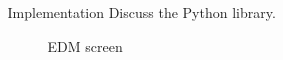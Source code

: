 \documentclass[final,t]{beamer}
\begin{document}
\begin{frame}
\begin{columns}[t]
\begin{column}{.32\linewidth}
  \end{column}



  \begin{column}{.32\linewidth}

  \begin{custombox}{Implementation}
    Discuss the Python library.
  \end{custombox}

      \begin{figure}[t]
          {%
        \setlength{\fboxsep}{0pt}%
        \setlength{\fboxrule}{3pt}%
              \caption{EDM screen}
        }%
\end{figure}

  \end{column}



  \begin{column}{.32\linewidth}


\end{column}
\end{columns}
\end{frame}
\end{document}
